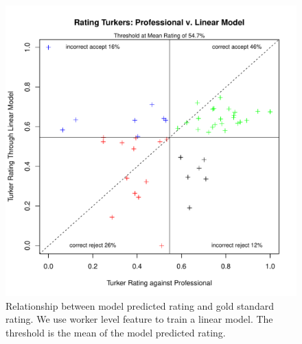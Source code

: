 \documentclass[11pt]{article}
\begin{document}
\begin{figure}[htbp]
  \centering
  \includegraphics[width=\linewidth]{Workerfeature/rrankingworkerfeaturelm.pdf}
  \caption{Relationship between model predicted rating and gold standard rating. We use worker level feature to train a linear model. The threshold is the mean of the model predicted rating.}
    \label{flmworkerrrating1}
\end{figure}
\end{document}
